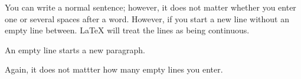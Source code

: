 \documentclass[12pt]{article}
\begin{document}
	You can write a normal sentence; however, it does not matter whether you enter one or several        spaces after a word.
However, if you start a new line without an empty line between. LaTeX will treat the lines as being continuous.

An empty line starts a new paragraph.



Again, it does not mattter how many empty lines you enter.
\end{document}
